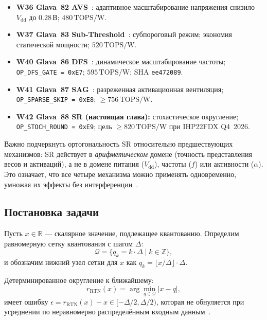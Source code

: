 \begin{itemize}
  \item \textbf{W36 Glava~82 AVS}~\cite{trios877}:
        адаптивное масштабирование напряжения снизило $V_{\mathrm{dd}}$
        до $0{.}28\,\text{В}$; $480\,\text{TOPS/W}$.
  \item \textbf{W37 Glava~83 Sub-Threshold}~\cite{trios882}:
        субпороговый режим; экономия статической мощности;
        $520\,\text{TOPS/W}$.
  \item \textbf{W40 Glava~86 DFS}~\cite{trios895}:
        динамическое масштабирование частоты; \texttt{OP\_DFS\_GATE = 0xE7};
        $595\,\text{TOPS/W}$; SHA \texttt{ee472089}.
  \item \textbf{W41 Glava~87 SAG}~\cite{trios898}:
        разреженная активационная вентиляция; \texttt{OP\_SPARSE\_SKIP = 0xE8};
        $\geq 756\,\text{TOPS/W}$.
  \item \textbf{W42 Glava~88 SR (настоящая глава):}
        стохастическое округление; \texttt{OP\_STOCH\_ROUND = 0xE9};
        цель $\geq 820\,\text{TOPS/W}$ при IHP22FDX Q4~2026.
\end{itemize}

Важно подчеркнуть ортогональность SR относительно предшествующих
механизмов: SR действует в \emph{арифметическом} домене (точность
представления весов и активаций), а не в домене питания ($V_{\mathrm{dd}}$),
частоты ($f$) или активности ($\alpha$).  Это означает, что все
четыре механизма можно применять одновременно, умножая их эффекты
без интерференции~\cite{jacob2018quantization}.

\subsection{Постановка задачи}
\label{ssec:glava88-problem}

Пусть $x \in \mathbb{R}$ — скалярное значение, подлежащее квантованию.
Определим равномерную сетку квантования с шагом $\Delta$:
\begin{equation}
  \mathcal{Q} = \{ q_k = k \cdot \Delta \mid k \in \mathbb{Z} \},
  \label{eq:quant-grid}
\end{equation}
и обозначим нижний узел сетки для $x$ как
$q_k = \lfloor x / \Delta \rfloor \cdot \Delta$.

Детерминированное округление к ближайшему:
\begin{equation}
  r_{\mathrm{RTN}}(x) = \arg\min_{q \in \mathcal{Q}} |x - q|,
  \label{eq:rtn}
\end{equation}
имеет ошибку $\epsilon = r_{\mathrm{RTN}}(x) - x \in [-\Delta/2, \Delta/2)$,
которая не обнуляется при усреднении по неравномерно распределённым
входным данным~\cite{gholami2022survey}.

